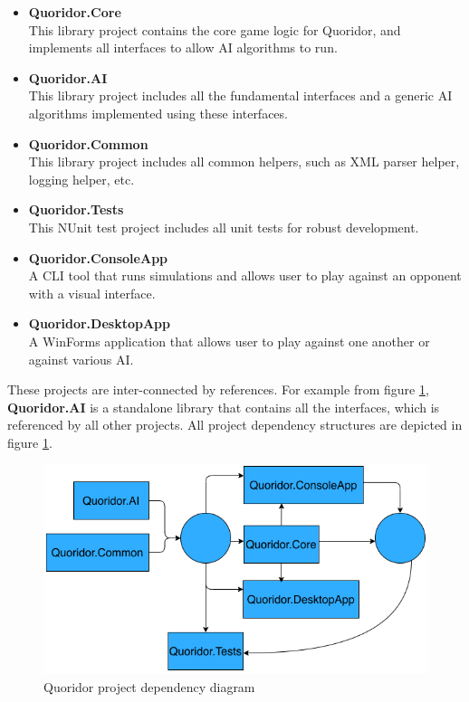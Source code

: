 \begin{itemize}
    \item \textbf{Quoridor.Core}\\
        This library project contains the core game logic for Quoridor, and implements all interfaces to allow \gls{AI} algorithms to run.
        
    \item \textbf{Quoridor.AI}\\
        This library project includes all the fundamental interfaces and a generic \gls{AI} algorithms implemented using these interfaces.

    \item \textbf{Quoridor.Common}\\
        This library project includes all common helpers, such as XML parser helper, logging helper, etc.

    \item \textbf{Quoridor.Tests}\\
        This NUnit test project includes all unit tests for robust development.

    \item \textbf{Quoridor.ConsoleApp}\\
        A CLI tool that runs simulations and allows user to play against an opponent with a visual interface.

    \item \textbf{Quoridor.DesktopApp}\\
        A WinForms application that allows user to play against one another or against various \gls{AI}.
\end{itemize}

These projects are inter-connected by references. For example from figure \ref{fig:proj_dep}, \textbf{Quoridor.AI} is a standalone library that contains all the interfaces, which is referenced by all other projects.
All project dependency structures are depicted in figure \ref{fig:proj_dep}.

\begin{figure}[!ht]
    \centering
    \includegraphics[width=.95\linewidth]{../img/project_structure.png}
    \caption{Quoridor project dependency diagram}
    \label{fig:proj_dep}
\end{figure}